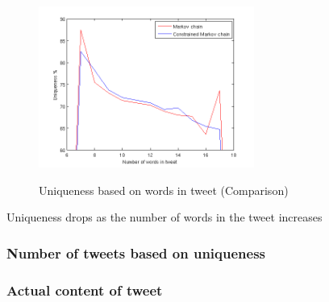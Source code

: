 \documentclass[a4paper,12pt]{article}
\begin{document}
 \begin{figure}[h!]
   \hfill
  {\includegraphics[width=1\linewidth, height = 200]{UniqByNumWordsTweet2.png}}
  \hfill
  \caption{Uniqueness based on words in tweet (Comparison)}
 \end{figure}
 
 Uniqueness drops as the number of words in the tweet increases

\newpage

\subsubsection{Number of tweets based on uniqueness}

\subsubsection{Actual content of tweet}

\newpage
\end{document}
